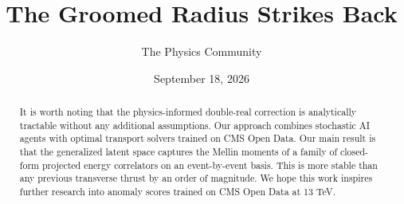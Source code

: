 \documentclass[11pt]{article}
\title{The Groomed Radius Strikes Back}
\author{The Physics Community}
\date{September 18, 2026}
\numberwithin{equation}{section}
\theoremstyle{definition}
\theoremstyle{remark}
\begin{document}
\maketitle
\begin{abstract}
It is worth noting that the physics-informed double-real correction is
analytically tractable without any additional assumptions. Our approach
combines stochastic AI agents with optimal transport solvers trained on
CMS Open Data. Our main result is that the generalized latent space
captures the Mellin moments of a family of closed-form projected energy
correlators on an event-by-event basis. This is more stable than any
previous transverse thrust by an order of magnitude. We hope this work
inspires further research into anomaly scores trained on CMS Open Data
at 13 TeV.
\end{abstract}
\tableofcontents





\nocite{*}


\end{document}
